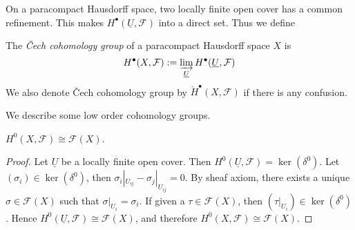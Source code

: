 On a paracompact Hausdorff space, two locally finite open cover has a common refinement.
This makes $H^\bullet(\underline{U},\mathcal{F})$ into a direct set.
Thus we define
\begin{defn}
    The \emph{\v{C}ech cohomology group} of a paracompact Hausdorff space $X$ is 
    \[H^\bullet(X,\mathcal{F}):=\varinjlim_{\underline{U}}H^\bullet(\underline{U},\mathcal{F})\]
    We also denote \v{C}ech cohomology group by $\check{H}^\bullet(X,\mathcal{F})$ if there is any confusion.
\end{defn}

We describe some low order cohomology groups.

\begin{prop}
    $H^0(X,\mathcal{F})\cong\mathcal{F}(X)$.
\end{prop}
\begin{proof}
    Let $\underline{U}$ be a locally finite open cover.
    Then $H^0(\underline{U},\mathcal{F})=\ker(\delta^0)$.
    Let $(\sigma_i)\in\ker(\delta^0)$, then $\sigma_i|_{U_{ij}}-\sigma_j|_{U_{ij}}=0$.
    By sheaf axiom, there exists a unique $\sigma\in\mathcal{F}(X)$ such that $\sigma|_{U_i}=\sigma_i$.
    If given a $\tau\in\mathcal{F}(X)$, then $(\tau|_{U_i})\in\ker(\delta^0)$.
    Hence $H^0(\underline{U},\mathcal{F})\cong\mathcal{F}(X)$, and therefore $H^0(X,\mathcal{F})\cong\mathcal{F}(X)$.
\end{proof}

